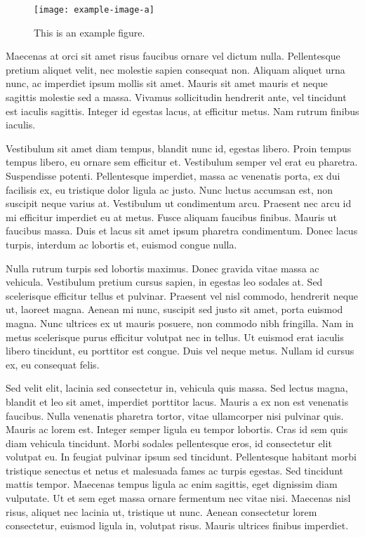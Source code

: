 \documentclass[10pt]{article}
\begin{document}
	\begin{figure}[t]
		\centering
		\texttt{[image: example-image-a]}
		\caption{This is an example figure.}
	\end{figure}
	
	Maecenas at orci sit amet risus faucibus ornare vel dictum nulla. Pellentesque pretium aliquet velit, nec molestie sapien consequat non. Aliquam aliquet urna nunc, ac imperdiet ipsum mollis sit amet. Mauris sit amet mauris et neque sagittis molestie sed a massa. Vivamus sollicitudin hendrerit ante, vel tincidunt est iaculis sagittis. Integer id egestas lacus, at efficitur metus. Nam rutrum finibus iaculis.
	
	Vestibulum sit amet diam tempus, blandit nunc id, egestas libero. Proin tempus tempus libero, eu ornare sem efficitur et. Vestibulum semper vel erat eu pharetra. Suspendisse potenti. Pellentesque imperdiet, massa ac venenatis porta, ex dui facilisis ex, eu tristique dolor ligula ac justo. Nunc luctus accumsan est, non suscipit neque varius at. Vestibulum ut condimentum arcu. Praesent nec arcu id mi efficitur imperdiet eu at metus. Fusce aliquam faucibus finibus. Mauris ut faucibus massa. Duis et lacus sit amet ipsum pharetra condimentum. Donec lacus turpis, interdum ac lobortis et, euismod congue nulla.
	
	Nulla rutrum turpis sed lobortis maximus. Donec gravida vitae massa ac vehicula. Vestibulum pretium cursus sapien, in egestas leo sodales at. Sed scelerisque efficitur tellus et pulvinar. Praesent vel nisl commodo, hendrerit neque ut, laoreet magna. Aenean mi nunc, suscipit sed justo sit amet, porta euismod magna. Nunc ultrices ex ut mauris posuere, non commodo nibh fringilla. Nam in metus scelerisque purus efficitur volutpat nec in tellus. Ut euismod erat iaculis libero tincidunt, eu porttitor est congue. Duis vel neque metus. Nullam id cursus ex, eu consequat felis.
	
	Sed velit elit, lacinia sed consectetur in, vehicula quis massa. Sed lectus magna, blandit et leo sit amet, imperdiet porttitor lacus. Mauris a ex non est venenatis faucibus. Nulla venenatis pharetra tortor, vitae ullamcorper nisi pulvinar quis. Mauris ac lorem est. Integer semper ligula eu tempor lobortis. Cras id sem quis diam vehicula tincidunt. Morbi sodales pellentesque eros, id consectetur elit volutpat eu. In feugiat pulvinar ipsum sed tincidunt. Pellentesque habitant morbi tristique senectus et netus et malesuada fames ac turpis egestas. Sed tincidunt mattis tempor. Maecenas tempus ligula ac enim sagittis, eget dignissim diam vulputate. Ut et sem eget massa ornare fermentum nec vitae nisi. Maecenas nisl risus, aliquet nec lacinia ut, tristique ut nunc. Aenean consectetur lorem consectetur, euismod ligula in, volutpat risus. Mauris ultrices finibus imperdiet.
	
\end{document}
